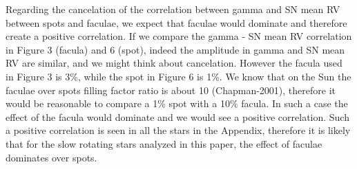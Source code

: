 \documentclass[11pt]{article}   	%
\begin{document}
\begin{enumerate}
{\color{blue} Regarding the cancelation of the correlation between gamma and SN mean RV between spots and faculae, we expect that faculae would dominate and therefore create a positive correlation. 
If we compare the gamma - SN mean RV correlation in Figure 3 (facula) and 6 (spot), indeed the amplitude in gamma and SN mean RV are similar, and we might think about cancelation. 
However the facula used in Figure 3 is 3\%, while the spot in Figure 6 is 1\%. 
We know that on the Sun the faculae over spots filling factor ratio is about 10 (Chapman-2001), therefore it would be reasonable to compare a 1\% spot with a 10\% facula. In such a case the effect of the facula would dominate and we would see a positive correlation. Such a positive correlation is seen in all the stars in the Appendix, therefore it is likely that for the slow rotating stars analyzed in this paper, the effect of faculae dominates over spots.

}
\end{enumerate}
\end{document}
